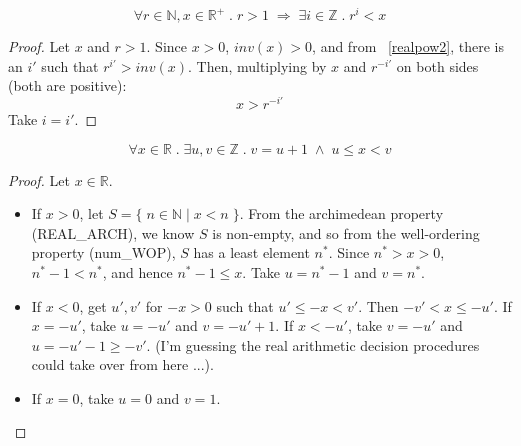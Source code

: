 \documentclass{article}
\begin{document}
\begin{lem}
\label{realpow3}
\begin{equation*}
\forall r \in \mathbb{N}, x \in \mathbb{R^+} \; . \; r > 1 \; \Longrightarrow \;
\exists i \in \mathbb{Z} \; . \; r^i < x
\end{equation*}
\begin{proof} Let $x$ and $r > 1$. Since $x > 0$,
$inv(x) > 0$, and from ~\ref{realpow2}, there is an $i'$ such that
$r^{i'} > inv(x)$. Then, multiplying by $x$ and $r^{-i'}$ on both sides (both are
positive):
\begin{equation*}
x > r^{-i'}
\end{equation*}
Take $i = i'$.
\end{proof}
\end{lem}

\begin{lem}
\label{realbetw}
\begin{equation*}
\forall x \in \mathbb{R} \; . \; \exists u, v \in \mathbb{Z} \; . \;
v = u + 1 \; \wedge \; u \leq x < v
\end{equation*}
\begin{proof} Let $x \in \mathbb{R}$.
\begin{itemize}
\item If $x > 0$, let $S = \{ \; n \in \mathbb{N} \; | \; x < n \; \}$.
From the archimedean property (REAL\_ARCH), we know $S$ is non-empty,
and so from the well-ordering property (num\_WOP), $S$ has a least element
$n^*$. Since $n^* > x > 0$, $n^* - 1 < n^*$, and hence $n^* - 1 \leq x$.
Take $u = n^* - 1$ and $v = n^*$.
\item If $x < 0$, get $u', v'$ for $-x > 0$ such that $u' \leq -x < v'$. Then
$-v' < x \leq -u'$. If $x = -u'$, take $u = -u'$ and $v = -u' + 1$. If
$x < -u'$, take $v = -u'$ and $u = -u' - 1 \geq -v'$. (I'm guessing the
real arithmetic decision procedures could take over from here ...).
\item If $x = 0$, take $u = 0$ and $v = 1$.
\end{itemize}
\end{proof}
\end{lem}
\end{document}
